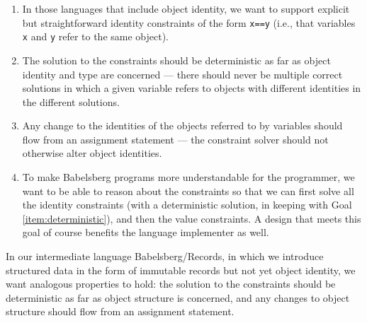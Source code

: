\documentclass{article}
\begin{document}
\begin{enumerate}
\item In those languages that include object identity, we want to
  support explicit but straightforward identity constraints of the
  form \verb|x==y| (i.e., that variables \verb|x| and \verb|y| refer
  to the same object).
\item\label{item:deterministic} The solution to the constraints should
  be deterministic as far as object identity and type are concerned
  --- there should never be multiple correct solutions in which a
  given variable refers to objects with different identities in the
  different solutions.
\item Any change to the identities of the objects referred to by
  variables should flow from an assignment statement --- the constraint
  solver should not otherwise alter object identities.
\item\label{item:solve-identity-then-values} To make Babelsberg
  programs more understandable for the programmer, we want to be able
  to reason about the constraints so that we can first solve all the
  identity constraints (with a deterministic solution, in keeping with
  Goal \ref{item:deterministic}), and then the value constraints.  A
  design that meets this goal of course benefits the language
  implementer as well.
\end{enumerate}

In our intermediate language Babelsberg/Records, in which we introduce
structured data in the form of immutable records but not yet object
identity, we want analogous properties to hold: the solution to the
constraints should be deterministic as far as object structure is
concerned, and any changes to object structure should flow from an
assignment statement.

\end{document}
